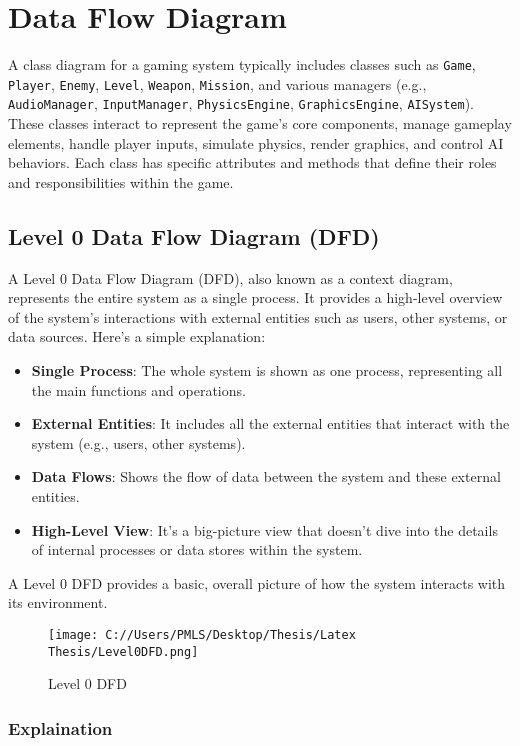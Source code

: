 \section{Data Flow Diagram}
A class diagram for a gaming system typically includes classes such as \texttt{Game}, \texttt{Player}, \texttt{Enemy}, \texttt{Level}, \texttt{Weapon}, \texttt{Mission}, and various managers (e.g., \texttt{AudioManager}, \texttt{InputManager}, \texttt{PhysicsEngine}, \texttt{GraphicsEngine}, \texttt{AISystem}). These classes interact to represent the game's core components, manage gameplay elements, handle player inputs, simulate physics, render graphics, and control AI behaviors. Each class has specific attributes and methods that define their roles and responsibilities within the game.

\subsection{Level 0 Data Flow Diagram (DFD)}
A Level 0 Data Flow Diagram (DFD), also known as a context diagram, represents the entire system as a single process. It provides a high-level overview of the system's interactions with external entities such as users, other systems, or data sources. Here’s a simple explanation:

\begin{itemize}
	\item \textbf{Single Process}: The whole system is shown as one process, representing all the main functions and operations.
	\item \textbf{External Entities}: It includes all the external entities that interact with the system (e.g., users, other systems).
	\item \textbf{Data Flows}: Shows the flow of data between the system and these external entities.
	\item \textbf{High-Level View}: It’s a big-picture view that doesn't dive into the details of internal processes or data stores within the system.
\end{itemize}

A Level 0 DFD provides a basic, overall picture of how the system interacts with its environment.
\begin{figure}[H]
	\centering
	\texttt{[image: C://Users/PMLS/Desktop/Thesis/Latex Thesis/Level0DFD.png]}
	\caption{Level 0 DFD}
	\label{fig:Level 0 Data Flow Diagram}
\end{figure}


\subsubsection{Explaination}

